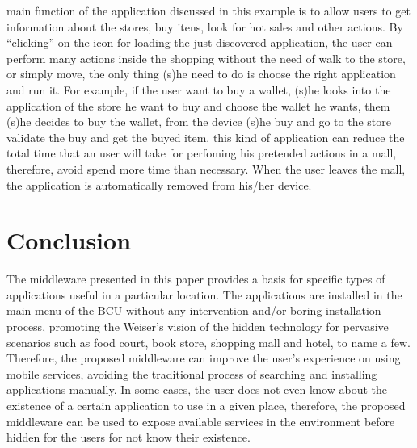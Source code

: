 \documentclass[journal]{IEEEtran}
\begin{document}
main function of the application discussed in this example is to allow users to get information about the stores, buy itens, look for hot sales and other actions. By “clicking” on the icon for loading the just discovered application, the user can perform many actions inside the shopping without the need of walk to the store, or simply move, the only thing (s)he need to do is choose the right application and run it. For example, if the user want to buy a wallet, (s)he looks into the application of the store he want to buy and choose the wallet he wants, them (s)he decides to buy the wallet, from the device (s)he buy and go to the store validate the buy and get the buyed item. this kind of application can reduce the total time that an user will take for perfoming his pretended actions in a mall, therefore, avoid spend more time than necessary. When the user leaves the mall, the application is automatically removed from his/her device.

\section{Conclusion}
The middleware presented in this paper provides a basis for specific types of applications useful in a particular location. The applications are installed in the main menu of the BCU without any intervention and/or boring installation process, promoting the Weiser’s vision of the hidden technology for pervasive scenarios such as food court, book store, shopping mall and hotel, to name a few. Therefore, the proposed middleware can improve the user’s experience on using mobile services, avoiding the traditional process of searching and installing applications manually. In some cases, the user does not even know about the existence of a certain application to use in a given place, therefore, the proposed middleware can be used to expose available services in the environment before hidden for the users for not know their existence.

\ifCLASSOPTIONcaptionsoff
  \newpage
\fi 

\end{document}
